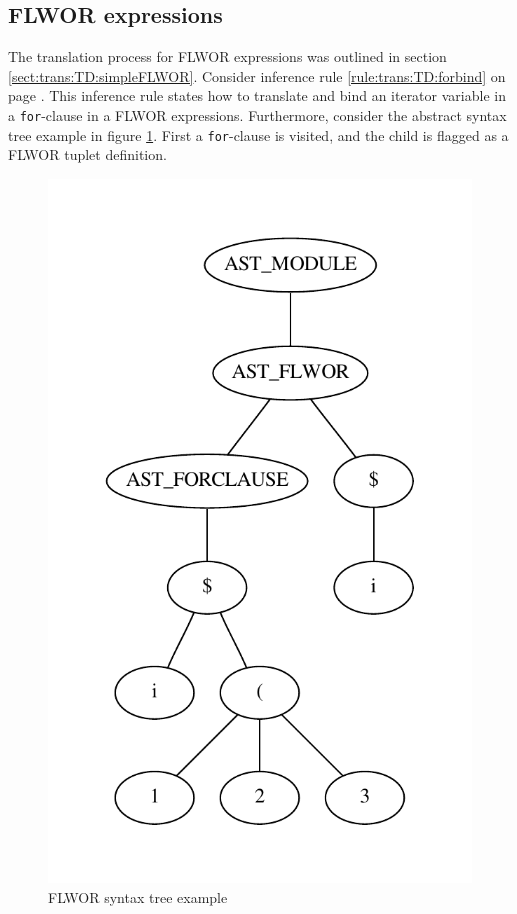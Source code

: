 \subsection{FLWOR expressions}
The translation process for FLWOR expressions was outlined in section
\ref{sect:trans:TD:simpleFLWOR}. Consider inference rule
\ref{rule:trans:TD:forbind} on page \pageref{rule:trans:TD:forbind}. This
inference rule states how to translate and bind an iterator variable in a
\texttt{for}-clause in a FLWOR expressions. Furthermore, consider the abstract
syntax tree example in figure \ref{fig:impl:td:flwor2}. First a
\texttt{for}-clause is visited, and the  child is flagged as a FLWOR tuplet
definition.
% 

\begin{figure}[!htp]
\begin{center}
  \includegraphics[scale=0.4]{img/graphs/flwor2}
  \caption{FLWOR syntax tree example}
  \label{fig:impl:td:flwor2}
\end{center}
\end{figure} 

